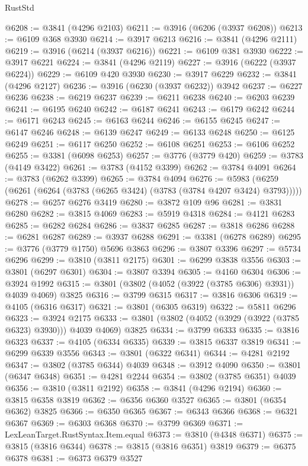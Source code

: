 \begin{lexlean}{RustStd}
\begin{coremodule}
@6208 := @3841 (@4296 @2103)
@6211 := @3916 (@6206 (@3937 @6208))
@6213 := @6109 @368 @3930
@6214 := @3917 @6213
@6216 := @3841 (@4296 @2111)
@6219 := @3916 (@6214 (@3937 @6216))
@6221 := @6109 @381 @3930
@6222 := @3917 @6221
@6224 := @3841 (@4296 @2119)
@6227 := @3916 (@6222 (@3937 @6224))
@6229 := @6109 @420 @3930
@6230 := @3917 @6229
@6232 := @3841 (@4296 @2127)
@6236 := @3916 (@6230 (@3937 @6232)) @3942
@6237 := @6227 @6236
@6238 := @6219 @6237
@6239 := @6211 @6238
@6240 := @6203 @6239
@6241 := @6195 @6240
@6242 := @6187 @6241
@6243 := @6179 @6242
@6244 := @6171 @6243
@6245 := @6163 @6244
@6246 := @6155 @6245
@6247 := @6147 @6246
@6248 := @6139 @6247
@6249 := @6133 @6248
@6250 := @6125 @6249
@6251 := @6117 @6250
@6252 := @6108 @6251
@6253 := @6106 @6252
@6255 := @3381 (@6098 @6253)
@6257 := @3776 (@3779 @420)
@6259 := @3783 (@4149 @3422)
@6261 := @3783 (@4152 @3399)
@6262 := @3784 @4091
@6264 := @3783 (@6262 @3399)
@6265 := @3784 @4094
@6276 := @5983 (@6259 (@6261 (@6264 (@3783 (@6265 @3424) (@3783 (@3784 @4207 @3424) @3793)))))
@6278 := @6257 @6276 @3419
@6280 := @3872 @109 @96
@6281 := @3831 @6280
@6282 := @3815 @4069
@6283 := @5919 @4318
@6284 := @4121 @6283
@6285 := @6282 @6284
@6286 := @3837 @6285
@6287 := @3818 @6286
@6288 := @6281 @6287
@6289 := @3937 @6288
@6291 := @3381 (@6278 @6289)
@6295 := @3776 (@3779 @1750) @5696 @3863
@6296 := @3807 @3396
@6297 := @5734 @6296
@6299 := @3810 (@3811 @2175)
@6301 := @6299 @3838 @3556
@6303 := @3801 (@6297 @6301)
@6304 := @3807 @3394
@6305 := @4160 @6304
@6306 := @3924 @1992
@6315 := @3801 (@3802 (@4052 (@3922 (@3785 @6306) @3931)) @4039 @4069) @3825
@6316 := @3799 @6315
@6317 := @3816 @6306
@6319 := @4105 (@6316 @6317)
@6321 := @3801 (@6305 @6319)
@6322 := @5811 @6296
@6323 := @3924 @2175
@6333 := @3801 (@3802 (@4052 (@3929 (@3922 (@3785 @6323) @3930))) @4039 @4069) @3825
@6334 := @3799 @6333
@6335 := @3816 @6323
@6337 := @4105 (@6334 @6335)
@6339 := @3815 @6337 @3819
@6341 := @6299 @6339 @3556
@6343 := @3801 (@6322 @6341)
@6344 := @4281 @2192
@6347 := @3802 (@3785 @6344) @4039
@6348 := @3912 @4090
@6350 := @3801 (@6347 @6348)
@6351 := @4281 @2244
@6354 := @3802 (@3785 @6351) @4039
@6356 := @3810 (@3811 @2192)
@6358 := @3841 (@4296 @2194)
@6360 := @3815 @6358 @3819
@6362 := @6356 @6360 @3527
@6365 := @3801 (@6354 @6362) @3825
@6366 := @6350 @6365
@6367 := @6343 @6366
@6368 := @6321 @6367
@6369 := @6303 @6368
@6370 := @3799 @6369
@6371 := LexLeanTarget.RustSyntax.Item.equal
@6373 := @3810 (@4348 @6371)
@6375 := @3815 (@3816 @6344)
@6378 := @3815 (@3816 @6351) @3819
@6379 := @6375 @6378
@6381 := @6373 @6379 @3527

\end{coremodule}
\end{lexlean}
